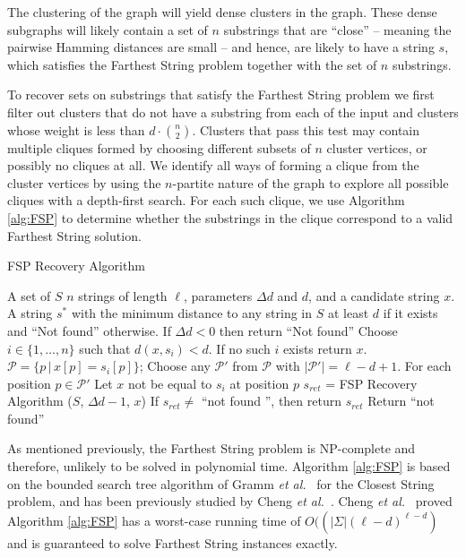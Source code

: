 The clustering of the graph will yield dense clusters in the graph.  These dense subgraphs will likely contain a set of $n$ substrings that are ``close'' -- meaning the pairwise Hamming distances are small -- and hence, are likely to have a string $s$, which satisfies the {\sc Farthest String} problem together with the set of $n$ substrings.

To recover sets on substrings that satisfy the {\sc Farthest String} problem we first filter out clusters that do not have a substring from each of the input and clusters whose weight is less than $d \cdot {n \choose 2}$. Clusters that pass this test may contain multiple cliques formed by choosing different subsets of $n$ cluster vertices, or possibly no cliques at all. We identify all ways of forming a clique from the cluster vertices by using the $n$-partite nature of the graph to explore all possible cliques with a depth-first search. For each such clique, we use Algorithm \ref{alg:FSP} to determine whether the substrings in the clique correspond to a valid {\sc Farthest String} solution.

\begin{algorithm}[h]
\caption{FSP Recovery Algorithm}
\begin{algorithmic}
 A set of $S$ $n$ strings of length $\ell$, parameters $\Delta d$ and $d$, and a candidate string $x$.
 A string $s^*$ with the minimum distance to any string in $S$ at least $d$ if it exists and ``Not found'' otherwise.
\STATE If $\Delta d < 0$ then return ``Not found''
\STATE Choose $i \in \{1, \ldots, n\}$ such that $d(x, s_i) < d$. If no such $i$ exists return $x$.
\STATE \hspace{5mm} $\mathcal{P} = \{p \, |  \, x[p] = s_i[p]\}$;
\STATE \hspace{5mm} Choose any $\mathcal{P}'$ from $\mathcal{P}$ with $|\mathcal{P}'| = \ell - d + 1$.
\STATE \hspace{5mm} For each position $p \in \mathcal{P}'$
\STATE \hspace{10mm} Let $x$ not be equal to $s_i$ at position $p$ 
\STATE \hspace{10mm} $s_{ret}$ = FSP Recovery Algorithm ($S$, $\Delta d - 1$, $x$) 
\STATE \hspace{10mm} If $s_{ret} \neq $ ``not found '', then return $s_{ret}$
\STATE Return ``not found''
\end{algorithmic}
\label{alg:FSP}
\end{algorithm}

As mentioned previously, the {\sc Farthest String} problem is NP-complete and therefore, unlikely to be solved in polynomial time. Algorithm \ref{alg:FSP} is based on the bounded search tree algorithm of Gramm {\em et al.}\ \cite{GNR03} for the {\sc Closest String} problem, and has been previously studied by Cheng {\em et al.}\ \cite{cheng}.  Cheng {\em et al.}\ \cite{cheng} proved Algorithm \ref{alg:FSP} has a worst-case running time of $O((|\Sigma|(\ell - d)^{\ell - d})$ and is guaranteed to solve {\sc Farthest String} instances exactly.  

